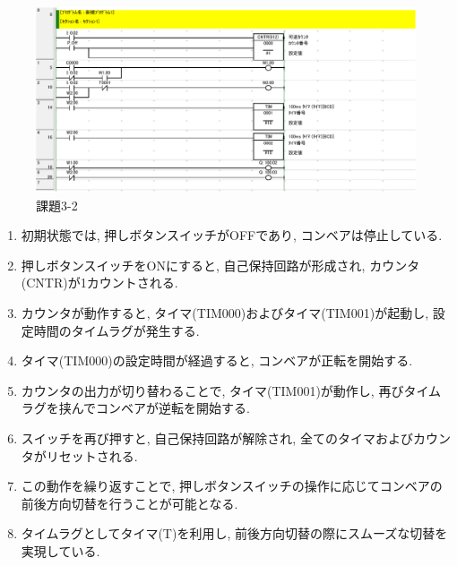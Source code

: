 \begin{figure}[H]
  \centering
  \includegraphics[scale=1]{sozai/3-2-crop.pdf}
  \caption{課題3-2}
\end{figure}

\begin{enumerate}
  \item 初期状態では, 押しボタンスイッチがOFFであり, コンベアは停止している.
  \item 押しボタンスイッチをONにすると, 自己保持回路が形成され, カウンタ(CNTR)が1カウントされる.
  \item カウンタが動作すると, タイマ(TIM000)およびタイマ(TIM001)が起動し, 設定時間のタイムラグが発生する.
  \item タイマ(TIM000)の設定時間が経過すると, コンベアが正転を開始する.
  \item カウンタの出力が切り替わることで, タイマ(TIM001)が動作し, 再びタイムラグを挟んでコンベアが逆転を開始する.
  \item スイッチを再び押すと, 自己保持回路が解除され, 全てのタイマおよびカウンタがリセットされる.
  \item この動作を繰り返すことで, 押しボタンスイッチの操作に応じてコンベアの前後方向切替を行うことが可能となる.
  \item タイムラグとしてタイマ(T)を利用し, 前後方向切替の際にスムーズな切替を実現している.
\end{enumerate}


